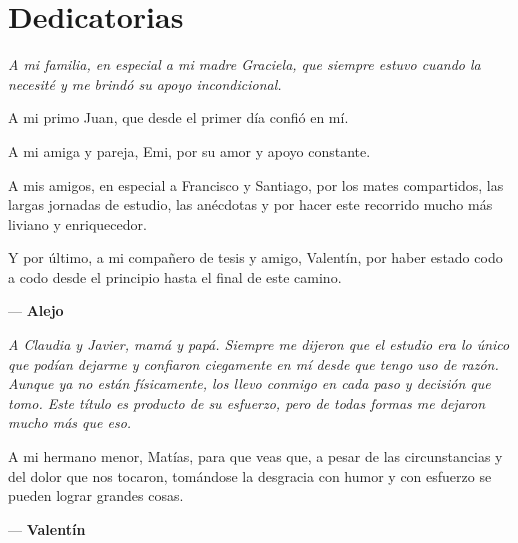 \cleardoublepage
\chapter*{Dedicatorias}

\vspace*{0.25\textheight}

\begin{flushright}
\begin{minipage}{0.75\textwidth}
    \itshape
    A mi familia, en especial a mi madre Graciela, que siempre estuvo cuando la necesité y me brindó su apoyo incondicional.
    
    \vspace{0.3cm}
    A mi primo Juan, que desde el primer día confió en mí.
    
    \vspace{0.3cm}
    A mi amiga y pareja, Emi, por su amor y apoyo constante.
    
    \vspace{0.3cm}
    A mis amigos, en especial a Francisco y Santiago, por los mates compartidos, las largas jornadas de estudio, las anécdotas y por hacer este recorrido mucho más liviano y enriquecedor.
    
    \vspace{0.3cm}
    Y por último, a mi compañero de tesis y amigo, Valentín, por haber estado codo a codo desde el principio hasta el final de este camino.
    
    \vspace{0.6cm}
    \raggedleft — \textbf{Alejo}
\end{minipage}
\end{flushright}

\newpage %

\vspace*{0.25\textheight}

\begin{flushright}
\begin{minipage}{0.75\textwidth}
    \itshape
    A Claudia y Javier, mamá y papá. Siempre me dijeron que el estudio era lo único que podían dejarme y confiaron ciegamente en mí desde que tengo uso de razón. Aunque ya no están físicamente, los llevo conmigo en cada paso y decisión que tomo. Este título es producto de su esfuerzo, pero de todas formas me dejaron mucho más que eso.
    
    \vspace{0.4cm}
    A mi hermano menor, Matías, para que veas que, a pesar de las circunstancias y del dolor que nos tocaron, tomándose la desgracia con humor y con esfuerzo se pueden lograr grandes cosas.
    
    \vspace{0.6cm}
    \raggedleft — \textbf{Valentín}
\end{minipage}
\end{flushright}